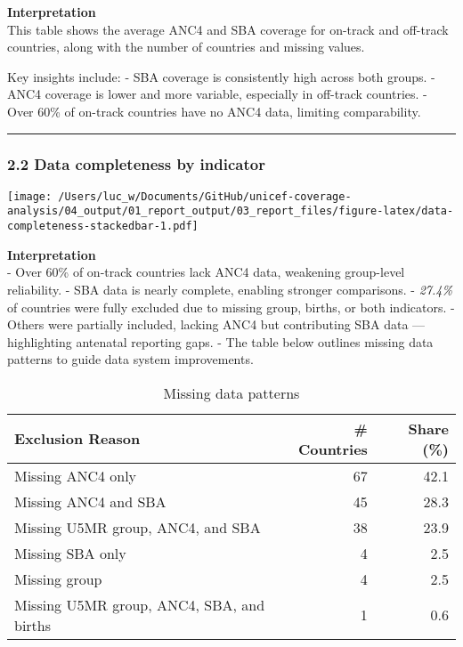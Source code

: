 \documentclass[
]{article}
\begin{document}
\textbf{Interpretation}\\
This table shows the average ANC4 and SBA coverage for on-track and
off-track countries, along with the number of countries and missing
values.

Key insights include: - SBA coverage is consistently high across both
groups. - ANC4 coverage is lower and more variable, especially in
off-track countries. - Over 60\% of on-track countries have no ANC4
data, limiting comparability.

\begin{center}\rule{0.5\linewidth}{0.5pt}\end{center}

\subsubsection{2.2 Data completeness by
indicator}\label{data-completeness-by-indicator}

\texttt{[image: /Users/luc\_w/Documents/GitHub/unicef-coverage-analysis/04\_output/01\_report\_output/03\_report\_files/figure-latex/data-completeness-stackedbar-1.pdf]}

\textbf{Interpretation}\\
- Over 60\% of on-track countries lack ANC4 data, weakening group-level
reliability. - SBA data is nearly complete, enabling stronger
comparisons. - \emph{27.4\%} of countries were fully excluded due to
missing group, births, or both indicators. - Others were partially
included, lacking ANC4 but contributing SBA data --- highlighting
antenatal reporting gaps. - The table below outlines missing data
patterns to guide data system improvements.

\begin{longtable}[t]{lrr}
\caption{\label{tab:exclusion-summary-table}Missing data patterns}\\
\toprule
Exclusion Reason & \# Countries & Share (\%)\\
\midrule
Missing ANC4 only & 67 & 42.1\\
Missing ANC4 and SBA & 45 & 28.3\\
Missing U5MR group, ANC4, and SBA & 38 & 23.9\\
Missing SBA only & 4 & 2.5\\
Missing group & 4 & 2.5\\
\addlinespace
Missing U5MR group, ANC4, SBA, and births & 1 & 0.6\\
\bottomrule
\end{longtable}
\end{document}
